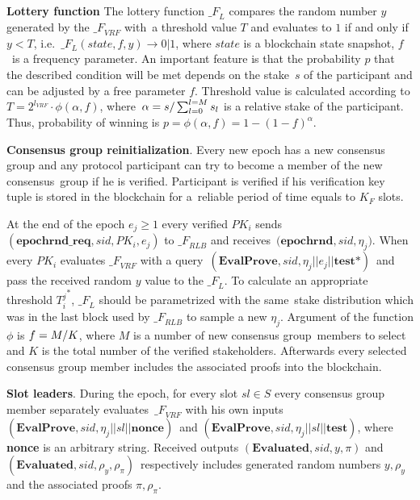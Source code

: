 \textbf{Lottery function}
The lottery function ${\mathcal_{F}}_{L}$ compares the random number $y$ generated by the ${\mathcal_{F}}_{VRF}$ with\
a threshold value $T$ and evaluates to $1$ if and only if ${y < T}$, i.e.\
${\mathcal_{F}}_{L}(state, f, y) \rightarrow 0|1$, where $state$ is a blockchain state snapshot, $f$\
is a frequency parameter.
An important feature is that the probability $p$ that the described condition will be met depends on the stake\
$s$ of the participant and can be adjusted by a free parameter $f$.
Threshold value is calculated according to ${T = 2^{l_{VRF}}\cdot \phi(\alpha, f)}$, where\
${\alpha=s/\\\sum_{l=0}^{l=M} s_l}$ is a relative stake of the participant.
Thus, probability of winning is ${p = \phi(\alpha, f) = 1-(1-f)^{\alpha}}$.

\textbf{Consensus group reinitialization}.
Every new epoch has a new consensus group and any protocol participant can try to become a member of the new consensus\
group if he is verified.
Participant is verified if his verification key tuple is stored in the blockchain for a\
reliable period of time equals to $K_F$ slots.

At the end of the epoch ${e_j \geqslant 1}$ every verified $PK_i$ sends\
${(\textbf{epochrnd\_req}, sid, PK_i, e_j)}$ to ${\mathcal_{F}}_{RLB}$ and receives\
$({\textbf{epochrnd}, sid, \eta_j)}$.
When every $PK_i$ evaluates ${\mathcal_{F}}_{VRF}$ with a query\
${(\textbf{EvalProve}, sid, \eta_j || e_j || \textbf{test*})}$\
and pass the received random $y$ value to the ${\mathcal_{F}}_{L}$.
To calculate an appropriate threshold ${T_i^j}^*$, ${\mathcal_{F}}_{L}$ should be parametrized with the same\
stake distribution which was in the last block used by ${\mathcal_{F}}_{RLB}$ to sample a new $\eta_j$.
Argument of the function $\phi$ is ${f = M /\/ K}$, where $M$ is a number of new consensus group\
members to select and $K$ is the total number of the verified stakeholders.
Afterwards every selected consensus group member includes the associated proofs into the blockchain.

\textbf{Slot leaders}.
During the epoch, for every slot ${sl \in S}$ every consensus group member separately evaluates\
${\mathcal_{F}}_{VRF}$ with his own inputs ${(\textbf{EvalProve}, sid, \eta_j || sl || \textbf{nonce})}$\
and ${(\textbf{EvalProve}, sid, \eta_j || sl || \textbf{test})}$, where \textbf{nonce} is an arbitrary string.
Received outputs ${(\textbf{Evaluated}, sid, y, \pi)}$ and ${(\textbf{Evaluated}, sid, \rho_y, \rho_\pi)}$\
respectively includes generated random numbers ${y, \rho_y}$ and the associated proofs ${\pi, \rho_\pi}$.

